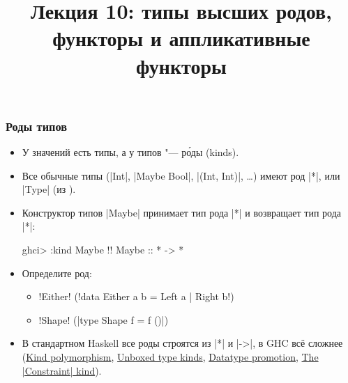 \documentclass[11pt]{beamer}
\title{Лекция 10: типы высших родов, функторы и аппликативные функторы}
\begin{document}
\begin{frame}[plain]
  \maketitle
\end{frame}

\begin{frame}[fragile]
  \frametitle{Роды типов}
  \begin{itemize}
    \item У значений есть типы, а у типов "--- р\'{о}ды (kinds).
    \item Все обычные типы (\haskinline|Int|, \haskinline|Maybe Bool|, \haskinline|(Int, Int)|, \ldots) имеют род \haskinline|*|, или \haskinline|Type| (из \href{https://hackage.haskell.org/package/base/docs/Data-Kind.html}{}).
          \pause
    \item Конструктор типов \haskinline|Maybe| принимает тип рода \haskinline|*| и возвращает тип рода \haskinline|*|:
          \begin{haskell}
            ghci> :kind Maybe !\pause!
            Maybe :: * -> *
          \end{haskell}
          \pause
    \item Определите род:
          \begin{itemize}
            \item \haskinline!Either! (\haskinline!data Either a b = Left a | Right b!)
                  \pause
            \item \haskinline!Shape! (\haskinline|type Shape f = f ()|)
                  \pause
          \end{itemize}
    \item В стандартном Haskell все роды строятся из \haskinline|*| и \haskinline|->|, в GHC всё сложнее (\href{https://downloads.haskell.org/~ghc/latest/docs/html/users_guide/exts/poly_kinds.html}{Kind polymorphism}, \href{https://downloads.haskell.org/~ghc/latest/docs/html/users_guide/exts/primitives.html}{Unboxed type kinds}, \href{https://downloads.haskell.org/~ghc/latest/docs/html/users_guide/exts/data_kinds.html}{Datatype promotion},  \href{https://downloads.haskell.org/~ghc/latest/docs/html/users_guide/exts/constraint_kind.html}{The \haskinline|Constraint| kind}).
  \end{itemize}
\end{frame}
\end{document}
